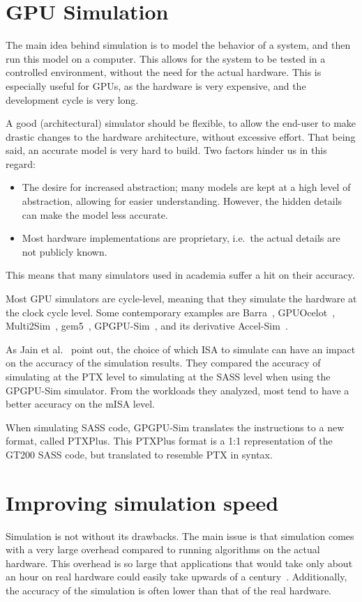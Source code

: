 \section{GPU Simulation}\label{sec:simulation}
The main idea behind simulation is to model the behavior of a system, and then run this model on a computer.
This allows for the system to be tested in a controlled environment, without the need for the actual hardware.
This is especially useful for GPUs, as the hardware is very expensive, and the development cycle is very long.

A good (architectural) simulator should be flexible, to allow the end-user to make drastic changes to the hardware architecture, without excessive effort.
That being said, an accurate model is very hard to build.
Two factors hinder us in this regard:
\begin{itemize}
    \item The desire for increased abstraction; many models are kept at a high level of abstraction, allowing for easier understanding.
    However, the hidden details can make the model less accurate.
    \item Most hardware implementations are proprietary, i.e.\ the actual details are not publicly known.
\end{itemize}
This means that many simulators used in academia suffer a hit on their accuracy.

Most GPU simulators are cycle-level, meaning that they simulate the hardware at the clock cycle level.
Some contemporary examples are Barra~\cite{barra}, GPUOcelot~\cite{ocelot}, Multi2Sim~\cite{multi2sim}, gem5~\cite{gem5}, GPGPU-Sim~\cite{gpgpu-sim}, and its derivative Accel-Sim~\cite{accelsim}.

As Jain et al.~\cite{sim-method} point out, the choice of which ISA to simulate can have an impact on the accuracy of the simulation results.
They compared the accuracy of simulating at the PTX level to simulating at the SASS level when using the GPGPU-Sim simulator.
From the workloads they analyzed, most tend to have a better accuracy on the mISA level.

When simulating SASS code, GPGPU-Sim translates the instructions to a new format, called PTXPlus.
This PTXPlus format is a 1:1 representation of the GT200 SASS code, but translated to resemble PTX in syntax.

\section{Improving simulation speed}\label{sec:improving-simulation-speed}
Simulation is not without its drawbacks.
The main issue is that simulation comes with a very large overhead compared to running algorithms on the actual hardware.
This overhead is so large that applications that would take only about an hour on real hardware could easily take upwards of a century~\cite{pks}.
Additionally, the accuracy of the simulation is often lower than that of the real hardware.

